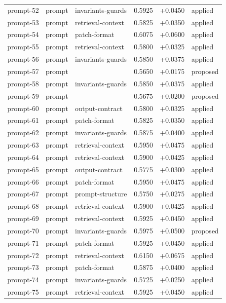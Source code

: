 \begin{center}
\begin{longtable}{llp{5.2cm}rrl}
prompt-52 & prompt & invariants-guards & 0.5925 & +0.0450 & applied \\
prompt-53 & prompt & retrieval-context & 0.5825 & +0.0350 & applied \\
prompt-54 & prompt & patch-format & 0.6075 & +0.0600 & applied \\
prompt-55 & prompt & retrieval-context & 0.5800 & +0.0325 & applied \\
prompt-56 & prompt & invariants-guards & 0.5850 & +0.0375 & applied \\
prompt-57 & prompt &  & 0.5650 & +0.0175 & proposed \\
prompt-58 & prompt & invariants-guards & 0.5850 & +0.0375 & applied \\
prompt-59 & prompt &  & 0.5675 & +0.0200 & proposed \\
prompt-60 & prompt & output-contract & 0.5800 & +0.0325 & applied \\
prompt-61 & prompt & patch-format & 0.5825 & +0.0350 & applied \\
prompt-62 & prompt & invariants-guards & 0.5875 & +0.0400 & applied \\
prompt-63 & prompt & retrieval-context & 0.5950 & +0.0475 & applied \\
prompt-64 & prompt & retrieval-context & 0.5900 & +0.0425 & applied \\
prompt-65 & prompt & output-contract & 0.5775 & +0.0300 & applied \\
prompt-66 & prompt & patch-format & 0.5950 & +0.0475 & applied \\
prompt-67 & prompt & prompt-structure & 0.5750 & +0.0275 & applied \\
prompt-68 & prompt & retrieval-context & 0.5900 & +0.0425 & applied \\
prompt-69 & prompt & retrieval-context & 0.5925 & +0.0450 & applied \\
prompt-70 & prompt & invariants-guards & 0.5975 & +0.0500 & proposed \\
prompt-71 & prompt & patch-format & 0.5925 & +0.0450 & applied \\
prompt-72 & prompt & retrieval-context & 0.6150 & +0.0675 & applied \\
prompt-73 & prompt & patch-format & 0.5875 & +0.0400 & applied \\
prompt-74 & prompt & invariants-guards & 0.5725 & +0.0250 & applied \\
prompt-75 & prompt & retrieval-context & 0.5925 & +0.0450 & applied \\

\end{longtable}
\end{center}
